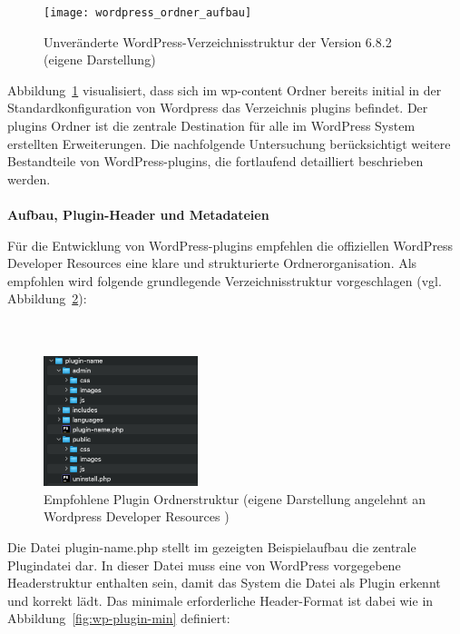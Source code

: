 \begin{figure}[tbh]
 \centering
 \texttt{[image: wordpress\_ordner\_aufbau]}
 \caption{Unveränderte WordPress-Verzeichnisstruktur der Version 6.8.2 (eigene Darstellung)}
 \label{fig:wordpress-verzeichnis}
\end{figure}
\newpage
Abbildung~\ref{fig:wordpress-verzeichnis} visualisiert, dass sich im wp-content Ordner bereits initial in der Standardkonfiguration von Wordpress das Verzeichnis plugins befindet.
Der plugins Ordner ist die zentrale Destination für alle im WordPress System erstellten Erweiterungen.
Die nachfolgende Untersuchung berücksichtigt weitere Bestandteile von WordPress-\gls{plugin}s, die fortlaufend detailliert beschrieben werden.
\\\\
\textbf{Aufbau, Plugin-Header und Metadateien}

Für die Entwicklung von WordPress-\gls{plugin}s empfehlen die offiziellen WordPress Developer Resources eine klare und strukturierte Ordnerorganisation. \cite{wordpress2024BestPractices}
Als empfohlen wird folgende grundlegende Verzeichnisstruktur vorgeschlagen (vgl. Abbildung~\ref{fig:wp-plugin-structure}):
\\\\\\
\begin{figure}[H]
    \centering
    \includegraphics[width=0.4\textwidth]{images/wp_plugin_structure}
    \caption{Empfohlene Plugin Ordnerstruktur (eigene Darstellung angelehnt an Wordpress Developer Resources \cite{wordpress2024FolderStructure})}
    \label{fig:wp-plugin-structure}
\end{figure}

Die Datei plugin-name.php stellt im gezeigten Beispielaufbau die zentrale Plugindatei dar.
In dieser Datei muss eine von WordPress vorgegebene Headerstruktur enthalten sein, damit das System die Datei als Plugin erkennt und korrekt lädt.
Das minimale erforderliche Header-Format ist dabei wie in Abbildung~\ref{fig:wp-plugin-min} definiert:

